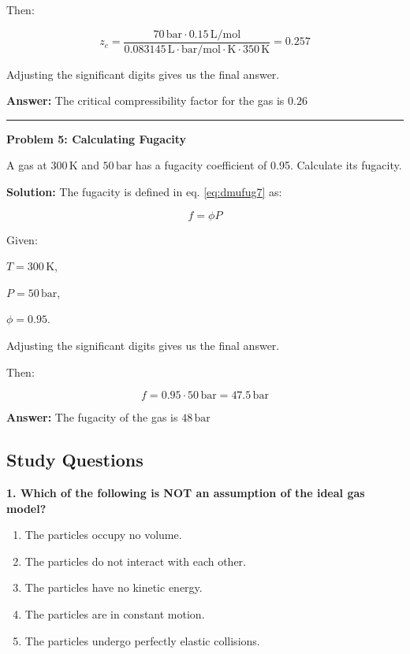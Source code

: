 \documentclass[
  9pt,
]{extbook}
\providecommand{\tightlist}{%
  \setlength{\itemsep}{0pt}\setlength{\parskip}{0pt}}
\theoremstyle{definition}
\theoremstyle{definition}
\theoremstyle{definition}
\theoremstyle{definition}
\theoremstyle{remark}
\begin{document}
Then:

\[z_c = \frac{70\,\text{bar} \cdot 0.15\,\text{L}/\text{mol}}{0.083145\,\text{L}\cdot\text{bar}/\text{mol}\cdot\text{K} \cdot 350\,\text{K}}=0.257\]

Adjusting the significant digits gives us the final answer.

\textbf{Answer:} The critical compressibility factor for the gas is \(0.26\)

\begin{center}\rule{0.5\linewidth}{0.5pt}\end{center}

\textbf{Problem 5: Calculating Fugacity}

A gas at \(300\,\text{K}\) and \(50\,\text{bar}\) has a fugacity coefficient of 0.95. Calculate its fugacity.

\textbf{Solution:} The fugacity is defined in eq. \eqref{eq:dmufug7} as:

\[f = \phi P\]

Given:

\(T = 300\,\text{K}\),

\(P = 50\,\text{bar}\),

\(\phi = 0.95\).

Adjusting the significant digits gives us the final answer.

Then:

\[f = 0.95 \cdot 50\,\text{bar}=47.5\,\text{bar} \]

\textbf{Answer:} The fugacity of the gas is \(48\,\text{bar}\)

\subsection{Study Questions}\label{quest11}

\textbf{1. Which of the following is NOT an assumption of the ideal gas model?}

\begin{enumerate}
\def\labelenumi{\alph{enumi}.}
\tightlist
\item
  The particles occupy no volume.
\item
  The particles do not interact with each other.
\item
  The particles have no kinetic energy.
\item
  The particles are in constant motion.
\item
  The particles undergo perfectly elastic collisions.
\end{enumerate}
\end{document}
